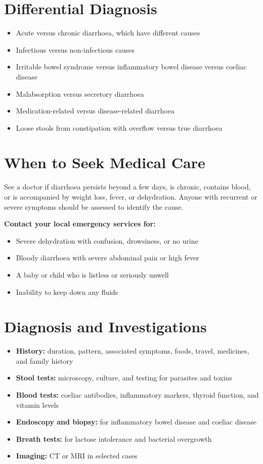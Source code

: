 \section*{Differential Diagnosis}
\begin{itemize}
    \item Acute versus chronic diarrhoea, which have different causes
    \item Infectious versus non-infectious causes
    \item Irritable bowel syndrome versus inflammatory bowel disease versus coeliac disease
    \item Malabsorption versus secretory diarrhoea
    \item Medication-related versus disease-related diarrhoea
    \item Loose stools from constipation with overflow versus true diarrhoea
\end{itemize}

\section*{When to Seek Medical Care}
See a doctor if diarrhoea persists beyond a few days, is chronic, contains blood, or is accompanied by weight loss, fever, or dehydration. Anyone with recurrent or severe symptoms should be assessed to identify the cause.

\textbf{Contact your local emergency services for:}
\begin{itemize}
    \item Severe dehydration with confusion, drowsiness, or no urine
    \item Bloody diarrhoea with severe abdominal pain or high fever
    \item A baby or child who is listless or seriously unwell
    \item Inability to keep down any fluids
\end{itemize}

\section*{Diagnosis and Investigations}
\begin{itemize}
    \item \textbf{History:} duration, pattern, associated symptoms, foods, travel, medicines, and family history
    \item \textbf{Stool tests:} microscopy, culture, and testing for parasites and toxins
    \item \textbf{Blood tests:} coeliac antibodies, inflammatory markers, thyroid function, and vitamin levels
    \item \textbf{Endoscopy and biopsy:} for inflammatory bowel disease and coeliac disease
    \item \textbf{Breath tests:} for lactose intolerance and bacterial overgrowth
    \item \textbf{Imaging:} CT or MRI in selected cases
\end{itemize}


